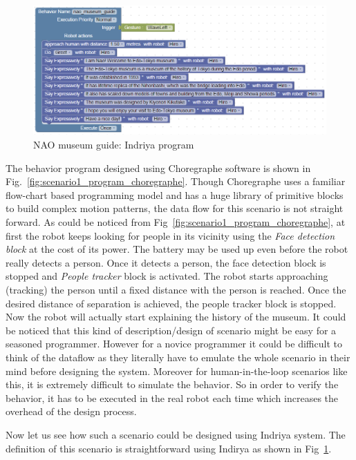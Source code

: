 \begin{figure}[H]
\centering
\includegraphics[width=\textwidth]{../thesis/assets/scenario1_new.png}
\caption[NAO museum guide: Indriya program]{NAO museum guide: Indriya program}
\label{fig:scenario1_program}
\end{figure}
The behavior program designed using Choregraphe software is shown in Fig.~\ref{fig:scenario1_program_choregraphe}. Though Choregraphe uses a familiar flow-chart based programming model and has a huge library of primitive blocks to build complex motion patterns, the data flow for this scenario is not straight forward. As could be noticed from Fig~\ref{fig:scenario1_program_choregraphe}, at first the robot keeps looking for people in its vicinity using the \emph{Face detection block} at the cost of its power. The battery may be used up even before the robot really detects a person. Once it detects a person, the face detection block is stopped and \emph{People tracker} block is activated. The robot starts approaching (tracking) the person until a fixed distance with the person is reached. Once the desired distance of separation is achieved, the people tracker block is stopped. Now the robot will actually start explaining the history of the museum. It could be noticed that this kind of description/design of scenario might be easy for a seasoned programmer. However for a novice programmer it could be difficult to think of the dataflow as they literally have to emulate the whole scenario in their mind before designing the system. Moreover for human-in-the-loop scenarios like this, it is extremely difficult to simulate the behavior. So in order to verify the behavior, it has to be executed in the real robot each time which increases the overhead of the design process.

Now let us see how such a scenario could be designed using Indriya system. The definition of this scenario is straightforward using Indirya as shown in Fig~\ref{fig:scenario1_program}.

